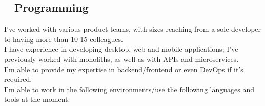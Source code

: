 \documentclass{modernsimplecv}
\newlength{\rightcolwidth}
\begin{document}
\begin{paracol}{2}
        \begin{minipage}[t]{\rightcolwidth}
            \small
            \section{\hspace{1mm}\faCogs~ Programming} 
            {
                \small
                I've worked with various product teams, with sizes reaching from a sole developer to having more than 10-15 colleagues.\\
                
                I have experience in developing desktop, web and mobile applications; I've previously worked with monoliths, as well as with APIs and microservices. \\
                
                I'm able to provide my expertise in backend/frontend or even DevOps if it's required. \\
                
                I'm able to work in the following environments/use the following languages and tools at the moment:
            }
        \end{minipage}\\
    
        \hspace{2em}
    
        \begin{skillsection}{\rightcolwidth}
             \\
             \\
             \\
             \\
             \\
             \\
             \\
             \\
             \\
             \\
        \end{skillsection}
    
        \vspace{2em}
        \bigskip
    
    \end{paracol}
\end{document}
